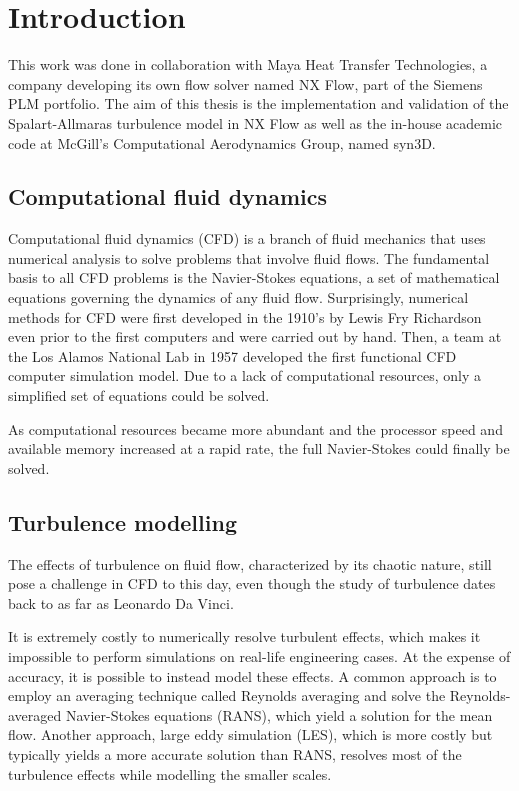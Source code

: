 \chapter{Introduction}
This work was done in collaboration with Maya Heat Transfer Technologies, a company developing its own flow solver named NX Flow, part of the Siemens PLM portfolio. The aim of this thesis is the implementation and validation of the Spalart-Allmaras turbulence model in NX Flow as well as the in-house academic code at McGill's Computational Aerodynamics Group, named syn3D.


\section{Computational fluid dynamics}
Computational fluid dynamics (CFD) is a branch of fluid mechanics that uses numerical analysis to solve problems that involve fluid flows. The fundamental basis to all CFD problems is the Navier-Stokes equations, a set of mathematical equations governing the dynamics of any fluid flow. Surprisingly, numerical methods for CFD were first developed in the 1910's by Lewis Fry Richardson even prior to the first computers and were carried out by hand. Then, a team at the Los Alamos National Lab in 1957 developed the first functional CFD computer simulation model. Due to a lack of computational resources, only a simplified set of equations could be solved.

As computational resources became more abundant and the processor speed and available memory increased at a rapid rate, the full Navier-Stokes could finally be solved.
\section{Turbulence modelling}
The effects of turbulence on fluid flow, characterized by its chaotic nature, still pose a challenge in CFD to this day, even though the study of turbulence dates back to as far as Leonardo Da Vinci.

It is extremely costly to numerically resolve turbulent effects, which makes it impossible to perform simulations on real-life engineering cases. At the expense of accuracy, it is possible to instead model these effects. A common approach is to employ an averaging technique called Reynolds averaging and solve the Reynolds-averaged Navier-Stokes equations (RANS), which yield a solution for the mean flow. Another approach, large eddy simulation (LES), which is more costly but typically yields a more accurate solution than RANS, resolves most of the turbulence effects while modelling the smaller scales.

